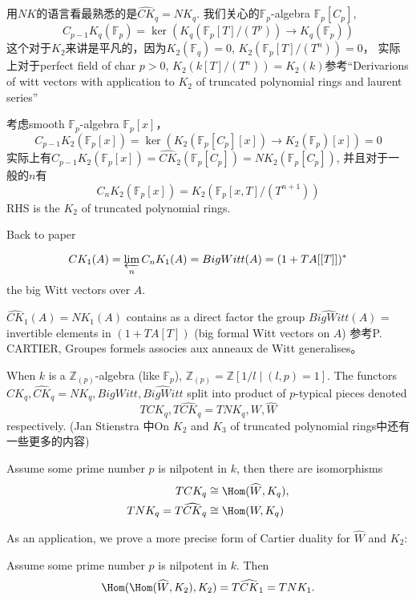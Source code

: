 用$NK$的语言看最熟悉的是$\widehat{CK}_q=NK_q$. 我们关心的$\mathbb{F}_p$-algebra $\mathbb{F}_p[C_p]$,
\[C_{p-1}K_q(\mathbb{F}_p)=\ker(K_q(\mathbb{F}_p[T]/(T^p)) \longrightarrow K_q(\mathbb{F}_p))\]
这个对于$K_2$来讲是平凡的，因为$K_2(\mathbb{F}_q)=0$, $K_2(\mathbb{F}_p[T]/(T^n))=0$， 实际上对于perfect field of char $p>0$, $K_2(k[T]/(T^n))=K_2(k)$参考“Derivarions of witt vectors with application to $K_2$ of truncated polynomial rings and laurent series”

考虑smooth $\mathbb{F}_p$-algebra $\mathbb{F}_p[x]$，
\[C_{p-1}K_2(\mathbb{F}_p[x])=\ker(K_2(\mathbb{F}_p[C_p][x]) \longrightarrow K_2(\mathbb{F}_p)[x])=0\]
实际上有$C_{p-1}K_2(\mathbb{F}_p[x])=\widehat{CK}_2(\mathbb{F}_p[C_p])=NK_2(\mathbb{F}_p[C_p])$, 并且对于一般的$n$有
\[C_nK_2(\mathbb{F}_p[x])=K_2(\mathbb{F}_p[x,T]/(T^{n+1}))\]
RHS is the $K_2$ of truncated polynomial rings.

Back to paper

\[CK_1(A)=\varprojlim_n C_nK_1(A)=BigWitt(A)=(1+TA[[T]])^*\] %
the big Witt vectors over $A$. 

$\widehat{CK}_1(A)=NK_1(A)$ contains as a direct factor the group $\widehat{BigWitt}(A)$ = invertible
elements  in $(1 +  TA[T])$  (big  formal  Witt  vectors  on $A$) 参考P. CARTIER,  Groupes  formels  associes  aux  anneaux  de Witt  generalises。

When $k$ is a $\mathbb{Z}_{(p)}$-algebra (like $\mathbb{F}_p$), $\mathbb{Z}_{(p)}=\mathbb{Z}[1/l\mid(l,p)=1]$. The functors $CK_q,\widehat{CK}_q=NK_q, BigWitt, \widehat{BigWitt}$ split into product of $p$-typical pieces denoted
\[TCK_q,T\widehat{CK}_q=TNK_q, W, \widehat{W}\]
respectively. ({\color{red}Jan Stienstra 中On $K_2$ and $K_3$ of truncated polynomial rings中还有一些更多的内容})
\begin{theorem}
	Assume some prime  number $p$ is nilpotent  in $k$, then there are isomorphisms
	\begin{align*}
	TCK_q & \cong\Hom(\widehat{W}, K_q),\\
	TNK_q=T\widehat{CK}_q  &\cong \Hom( W, K_q)
	\end{align*}
\end{theorem}
As an application,  we prove a more precise  form  of Cartier
duality  for $\widehat{W}$ and $K_2$:
\begin{theorem}
	Assume some prime  number $p$ is nilpotent  in $k$. Then
	\[\Hom(\Hom(\widehat{W},  K_2),  K_2)  = T\widehat{CK}_1=TNK_1.\]
\end{theorem}

